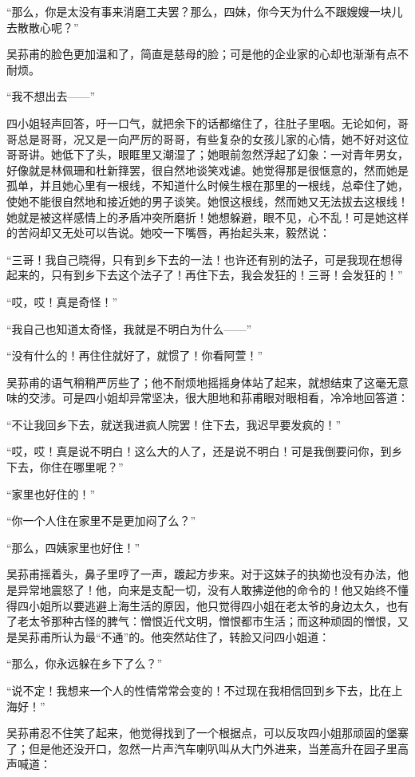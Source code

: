 \par “那么，你是太没有事来消磨工夫罢？那么，四妹，你今天为什么不跟嫂嫂一块儿去散散心呢？”
\par 吴荪甫的脸色更加温和了，简直是慈母的脸；可是他的企业家的心却也渐渐有点不耐烦。
\par “我不想出去——”
\par 四小姐轻声回答，吁一口气，就把余下的话都缩住了，往肚子里咽。无论如何，哥哥总是哥哥，况又是一向严厉的哥哥，有些复杂的女孩儿家的心情，她不好对这位哥哥讲。她低下了头，眼眶里又潮湿了；她眼前忽然浮起了幻象：一对青年男女，好像就是林佩珊和杜新箨罢，很自然地谈笑戏谑。她觉得那是很惬意的，然而她是孤单，并且她心里有一根线，不知道什么时候生根在那里的一根线，总牵住了她，使她不能很自然地和接近她的男子谈笑。她恨这根线，然而她又无法拔去这根线！她就是被这样感情上的矛盾冲突所磨折！她想躲避，眼不见，心不乱！可是她这样的苦闷却又无处可以告说。她咬一下嘴唇，再抬起头来，毅然说：
\par “三哥！我自己晓得，只有到乡下去的一法！也许还有别的法子，可是我现在想得起来的，只有到乡下去这个法子了！再住下去，我会发狂的！三哥！会发狂的！”
\par “哎，哎！真是奇怪！”
\par “我自己也知道太奇怪，我就是不明白为什么——”
\par “没有什么的！再住住就好了，就惯了！你看阿萱！”
\par 吴荪甫的语气稍稍严厉些了；他不耐烦地摇摇身体站了起来，就想结束了这毫无意味的交涉。可是四小姐却异常坚决，很大胆地和荪甫眼对眼相看，冷冷地回答道：
\par “不让我回乡下去，就送我进疯人院罢！住下去，我迟早要发疯的！”
\par “哎，哎！真是说不明白！这么大的人了，还是说不明白！可是我倒要问你，到乡下去，你住在哪里呢？”
\par “家里也好住的！”
\par “你一个人住在家里不是更加闷了么？”
\par “那么，四姨家里也好住！”
\par 吴荪甫摇着头，鼻子里哼了一声，踱起方步来。对于这妹子的执拗也没有办法，他是异常地震怒了！他，向来是支配一切，没有人敢拂逆他的命令的！他又始终不懂得四小姐所以要逃避上海生活的原因，他只觉得四小姐在老太爷的身边太久，也有了老太爷那种古怪的脾气：憎恨近代文明，憎恨都市生活；而这种顽固的憎恨，又是吴荪甫所认为最“不通”的。他突然站住了，转脸又问四小姐道：
\par “那么，你永远躲在乡下了么？”
\par “说不定！我想来一个人的性情常常会变的！不过现在我相信回到乡下去，比在上海好！”
\par 吴荪甫忍不住笑了起来，他觉得找到了一个根据点，可以反攻四小姐那顽固的堡寨了；但是他还没开口，忽然一片声汽车喇叭叫从大门外进来，当差高升在园子里高声喊道：

